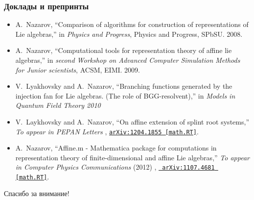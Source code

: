 \documentclass[pdftex]{beamer}
\theoremstyle{definition} \newtheorem{Def}{Определение}
\begin{document}
\begin{frame}
  \frametitle{Доклады и препринты}
  \begin{itemize}
  \item
    A.~Nazarov, ``Comparison of algorithms for construction of representations of
    Lie algebras,'' in {\em Physics and Progress}, Physics and Progress, SPbSU.
     2008.

  \item
    A.~Nazarov, ``Computational tools for representation theory of affine lie
    algebras,'' in {\em second Workshop on Advanced Computer Simulation Methods
      for Junior scientists}, ACSM, EIMI.
     2009.

  \item
    V.~{Lyakhovsky} and A.~{Nazarov}, ``{Branching functions generated by the
      injection fan for Lie algebras. (The role of BGG-resolvent)},'' in 
    {\em Models in Quantum Field Theory 2010} 

  \item
    V.~{Laykhovsky} and A.~{Nazarov}, ``{On affine extension of splint root
      systems},'' {\em To appear in PEPAN Letters}  ,
    \href{http://arxiv.org/abs/1204.1855}{{\tt arXiv:1204.1855 [math.RT]}}.
  \item
    A.~{Nazarov}, ``{Affine.m - Mathematica package for computations in
      representation theory of finite-dimensional and affine Lie algebras},'' {\em
    To appear in Computer Physics Communications} (2012)  , \href{http://arxiv.org/abs/1107.4681}{{\tt
        arXiv:1107.4681 [math.RT]}}.
  \end{itemize}
\end{frame}

\begin{frame}[c]
  \begin{center}
  \Large{Спасибо за внимание!}    
  \end{center}

\end{frame}
\end{document}
